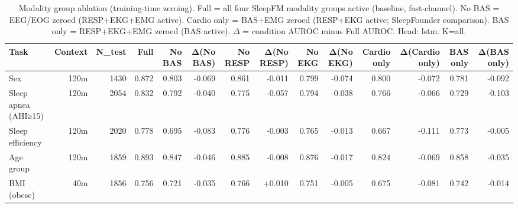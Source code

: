 \begin{table}[ht]
\centering
\caption{Modality group ablation (training-time zeroing). Full = all four SleepFM modality groups active (baseline, fast-channel). No BAS = EEG/EOG zeroed (RESP+EKG+EMG active). Cardio only = BAS+EMG zeroed (RESP+EKG active; SleepFounder comparison). BAS only = RESP+EKG+EMG zeroed (BAS active). $\Delta$ = condition AUROC minus Full AUROC. Head: lstm. K=all.}
\label{tab:modality_ablation}
\begin{tabular}{lrrrrrrrrrrrrr}
\toprule
Task & Context & N_test & Full & No BAS & Δ(No BAS) & No RESP & Δ(No RESP) & No EKG & Δ(No EKG) & Cardio only & Δ(Cardio only) & BAS only & Δ(BAS only) \\
\midrule
Sex & 120m & 1430 & 0.872 & 0.803 & -0.069 & 0.861 & -0.011 & 0.799 & -0.074 & 0.800 & -0.072 & 0.781 & -0.092 \\
Sleep apnea (AHI≥15) & 120m & 2054 & 0.832 & 0.792 & -0.040 & 0.775 & -0.057 & 0.794 & -0.038 & 0.766 & -0.066 & 0.729 & -0.103 \\
Sleep efficiency & 120m & 2020 & 0.778 & 0.695 & -0.083 & 0.776 & -0.003 & 0.765 & -0.013 & 0.667 & -0.111 & 0.773 & -0.005 \\
Age group & 120m & 1859 & 0.893 & 0.847 & -0.046 & 0.885 & -0.008 & 0.876 & -0.017 & 0.824 & -0.069 & 0.858 & -0.035 \\
BMI (obese) & 40m & 1856 & 0.756 & 0.721 & -0.035 & 0.766 & +0.010 & 0.751 & -0.005 & 0.675 & -0.081 & 0.742 & -0.014 \\
\bottomrule
\end{tabular}
\end{table}